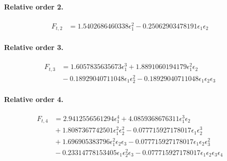 \documentclass[10pt]{article}
\begin{document}
\paragraph{Relative order 2.}
\begin{align*}
F_{t,2} &= 1.5402686460338 \epsilon_{1}^{2} - 0.25062903478191 \epsilon_{1} \epsilon_{2}
\end{align*}

\paragraph{Relative order 3.}
\begin{align*}
F_{t,3} &= 1.6057835635673 \epsilon_{1}^{3} + 1.8891060194179 \epsilon_{1}^{2} \epsilon_{2} \\
&{}  - 0.18929040711048 \epsilon_{1} \epsilon_{2}^{2} - 0.18929040711048 \epsilon_{1} \epsilon_{2} \epsilon_{3}
\end{align*}

\paragraph{Relative order 4.}
\begin{align*}
F_{t,4} &= 2.9412556561294 \epsilon_{1}^{4} + 4.0859368676311 \epsilon_{1}^{3} \epsilon_{2} \\
&{}  + 1.8087367742501 \epsilon_{1}^{2} \epsilon_{2}^{2} - 0.077715927178017 \epsilon_{1} \epsilon_{2}^{3} \\
&{}  + 1.696905383796 \epsilon_{1}^{2} \epsilon_{2} \epsilon_{3} - 0.077715927178017 \epsilon_{1} \epsilon_{2} \epsilon_{3}^{2} \\
&{}  - 0.23314778153405 \epsilon_{1} \epsilon_{2}^{2} \epsilon_{3} - 0.077715927178017 \epsilon_{1} \epsilon_{2} \epsilon_{3} \epsilon_{4}
\end{align*}
\end{document}
